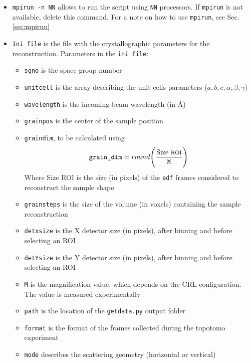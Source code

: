 \documentclass[11pt]{scrartcl}
\begin{document}
\begin{itemize}
    \item {\texttt{mpirun -n NN}} allows to run the script using {\texttt{NN}} processors. If {\texttt{mpirun}} is not available, delete this command. For a note on how to use {\texttt{mpirun}}, see Sec. \ref{sec:mpirun}
    \item {\texttt{Ini file}} is the file with the crystallographic parameters for the reconstruction. Parameters in the {\texttt{ini file}}:
    \begin{itemize}
        \item {\texttt{sg\textunderscore no}} is the space group number
        \item {\texttt{unit\textunderscore cell}} is the array describing the unit cells parameters ($a,b,c,\alpha, \beta, \gamma$)
        \item {\texttt{wavelength}} is the incoming beam wavelength (in \AA)
        \item {\texttt{grain\textunderscore pos}} is the center of the sample position
        \item {\texttt{grain\textunderscore dim}}, to be calculated using
        \begin{equation}
            {\texttt{grain\textunderscore dim}} = round \Bigg( \frac{{\text{Size {\footnotesize{ROI}}}}}{\texttt{M}} \Bigg)
        \end{equation}
        Where Size {\footnotesize{ROI}} is the size (in pixels) of the {\texttt{edf}} frames considered to reconstruct the sample shape
        \item {\texttt{grain\textunderscore steps}} is the size of the volume (in voxels) containing the sample reconstruction
        \item {\texttt{detx\textunderscore size}} is the {\footnotesize{X}} detector size (in pixels), after binning and before selecting an {\footnotesize{ROI}}
        \item {\texttt{detY\textunderscore size}} is the {\footnotesize{Y}} detector size (in pixels), after binning and before selecting an {\footnotesize{ROI}}
        \item {\texttt{M}} is the magnification value, which depends on the {\footnotesize{CRL}} configuration. The value is measured experimentally
        \item {\texttt{path}} is the location of the {\texttt{getdata.py}} output folder
        \item {\texttt{format}} is the format of the frames collected during the topotomo experiment
        \item {\texttt{mode}} describes the scattering geometry (horizontal or vertical)
    \end{itemize}


\end{itemize}
\end{document}
